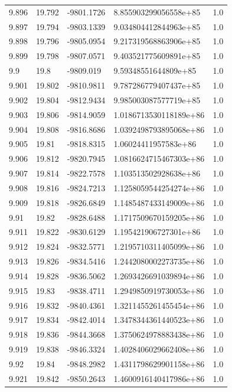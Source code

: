 \begin{tabular}{lllll}
9.896 & 19.792 & -9801.1726 & 8.855903299056558e+85 & 1.0 \\
9.897 & 19.794 & -9803.1339 & 9.034804412844963e+85 & 1.0 \\
9.898 & 19.796 & -9805.0954 & 9.217319568863906e+85 & 1.0 \\
9.899 & 19.798 & -9807.0571 & 9.403521775609891e+85 & 1.0 \\
9.9 & 19.8 & -9809.019 & 9.59348551644809e+85 & 1.0 \\
9.901 & 19.802 & -9810.9811 & 9.787286779407437e+85 & 1.0 \\
9.902 & 19.804 & -9812.9434 & 9.985003087577719e+85 & 1.0 \\
9.903 & 19.806 & -9814.9059 & 1.0186713530118189e+86 & 1.0 \\
9.904 & 19.808 & -9816.8686 & 1.0392498793895068e+86 & 1.0 \\
9.905 & 19.81 & -9818.8315 & 1.06024411957583e+86 & 1.0 \\
9.906 & 19.812 & -9820.7945 & 1.0816624715467303e+86 & 1.0 \\
9.907 & 19.814 & -9822.7578 & 1.103513502928638e+86 & 1.0 \\
9.908 & 19.816 & -9824.7213 & 1.1258059544254274e+86 & 1.0 \\
9.909 & 19.818 & -9826.6849 & 1.1485487433149009e+86 & 1.0 \\
9.91 & 19.82 & -9828.6488 & 1.1717509670159205e+86 & 1.0 \\
9.911 & 19.822 & -9830.6129 & 1.195421906727301e+86 & 1.0 \\
9.912 & 19.824 & -9832.5771 & 1.2195710311405099e+86 & 1.0 \\
9.913 & 19.826 & -9834.5416 & 1.2442080002273735e+86 & 1.0 \\
9.914 & 19.828 & -9836.5062 & 1.2693426691039894e+86 & 1.0 \\
9.915 & 19.83 & -9838.4711 & 1.2949850919730053e+86 & 1.0 \\
9.916 & 19.832 & -9840.4361 & 1.3211455261455454e+86 & 1.0 \\
9.917 & 19.834 & -9842.4014 & 1.3478344361440523e+86 & 1.0 \\
9.918 & 19.836 & -9844.3668 & 1.3750624978883438e+86 & 1.0 \\
9.919 & 19.838 & -9846.3324 & 1.4028406029662408e+86 & 1.0 \\
9.92 & 19.84 & -9848.2982 & 1.4311798629901158e+86 & 1.0 \\
9.921 & 19.842 & -9850.2643 & 1.4600916140417986e+86 & 1.0 \\

\end{tabular}
